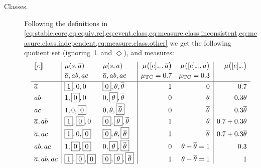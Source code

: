 \documentclass{llncs}
\newcommand{\at}[1]{\ensuremath{\!\del{#1}}}
\newcommand{\co}[1]{\ensuremath{\overline{#1}}}
\newcommand{\stablecore}[1]{\ensuremath{\left\llbracket #1 \right\rrbracket}}
\newcommand{\pw}[1]{\ensuremath{\mu\at{#1}}}
\newcommand{\pwcfname}{\ensuremath{\mu_{\textrm{TC}}}}
\newcommand{\class}[1]{\ensuremath{[{#1}]_{\sim}}}
\newcommand{\inconsistent}{\bot}
\newcommand{\indepclass}{\ensuremath{\Diamond}}
\begin{document}
\begin{description}
    \item[Classes.] Following the definitions in \cref{eq:stable.core,eq:equiv.rel,eq:event.class,eq:measure.class.inconsistent,eq:measure.class.independent,eq:measure.class.other} we get the following quotient set (ignoring $\inconsistent$ and $\indepclass$), and measures:
          \begin{equation*}
              \begin{array}{l|ll|rr|r}
                  \stablecore{e}
                   & \pw{s, \co{a}}
                   & \pw{s, a}
                   & \pw{\class{e}, \co{a}}
                   & \pw{\class{e}, a}
                   & \pw{\class{e}}
                  \\[2pt]
                   & \co{a}, ab, ac
                   & \co{a}, ab, ac
                   & \pwcfname=0.7
                   & \pwcfname=0.3
                   &
                  \\[2pt]
                  \hline
                  \co{a}
                   & \boxed{1},0,0
                   & \boxed{0},\theta, \co{\theta}
                   & 1
                   & 0
                   & 0.7
                  \\[2pt]
                  ab
                   & 1,\boxed{0},0
                   & 0,\boxed{\theta}, \co{\theta}
                   & 0
                   & \theta
                   & 0.3\theta
                  \\[2pt]
                  ac
                   & 1,0,\boxed{0}
                   & 0,\theta, \boxed{\co{\theta}}
                   & 0
                   & \co{\theta}
                   & 0.3\co{\theta}
                  \\[2pt]
                  \co{a}, ab
                   & \boxed{1},\boxed{0},0
                   & \boxed{0},\boxed{\theta}, \co{\theta}
                   & 1
                   & \theta
                   & 0.7 + 0.3\theta
                  \\[2pt]
                  \co{a}, ac
                   & \boxed{1},0,\boxed{0}
                   & \boxed{0},\theta, \boxed{\co{\theta}}
                   & 1
                   & \co{\theta}
                   & 0.7 + 0.3\co{\theta}
                  \\[2pt]
                  ab, ac
                   & 1,\boxed{0},\boxed{0}
                   & 0,\boxed{\theta}, \boxed{\co{\theta}}
                   & 0
                   & \theta + \co{\theta} = 1
                   & 0.3
                  \\[2pt]
                  \co{a}, ab, ac
                   & \boxed{1},\boxed{0},\boxed{0}
                   & \boxed{0},\boxed{\theta}, \boxed{\co{\theta}}
                   & 1
                   & \theta + \co{\theta} = 1
                   & 1
              \end{array}
          \end{equation*}


\end{description}
\end{document}
